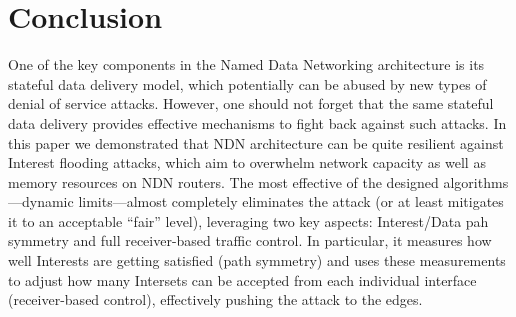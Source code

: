 \section{Conclusion}
\label{sec:conclusion}




One of the key components in the Named Data Networking architecture is its stateful data delivery model, which potentially can be abused by new types of denial of service attacks.
However, one should not forget that the same stateful data delivery provides effective mechanisms to fight back against such attacks.
In this paper we demonstrated that NDN architecture can be quite resilient against Interest flooding attacks, which aim to overwhelm network capacity as well as memory resources on NDN routers.
The most effective of the designed algorithms---dynamic limits---almost completely eliminates the attack (or at least mitigates it to an acceptable ``fair'' level), leveraging two key aspects: Interest/Data pah symmetry and full receiver-based traffic control.
In particular, it measures how well Interests are getting satisfied (path symmetry) and uses these measurements to adjust how many Intersets can be accepted from each individual interface (receiver-based control), effectively pushing the attack to the edges.






